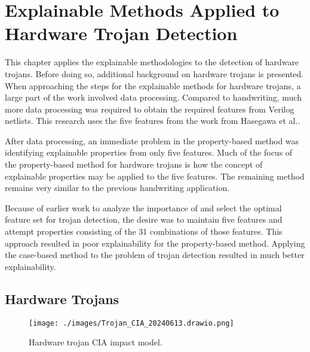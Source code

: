 \chapter{Explainable Methods Applied to Hardware Trojan Detection} \label{ch:trojan}

This chapter applies the explainable methodologies to the detection of hardware
trojans. Before doing so, additional background on hardware trojans is
presented. When approaching the steps for the explainable methods for hardware
trojans, a large part of the work involved data processing. Compared to
handwriting, much more data processing was required to obtain the required
features from Verilog netlists. This research uses the five features from the
work from Hasegawa et al.\cite{7604700}.

After data processing, an immediate problem in the property-based method was
identifying explainable properties from only five features. Much of the focus of
the property-based method for hardware trojans is how the concept of explainable
properties may be applied to the five features. The remaining method remains
very similar to the previous handwriting application.

Because of earlier work to analyze the importance of and select the optimal
feature set for trojan detection\cite{7604700, hasegawa2020hardware}, the desire
was to maintain five features and attempt properties consisting of the 31
combinations of those features. This approach resulted in poor explainability
for the property-based method. Applying the case-based method to the problem of
trojan detection resulted in much better explainability.

\section{Hardware Trojans}

\begin{figure}[H]
    \centering
    \texttt{[image: ./images/Trojan\_CIA\_20240613.drawio.png]}
    \caption{Hardware trojan CIA impact model.}
    \label{fig:cia_impact_model}
\end{figure}

